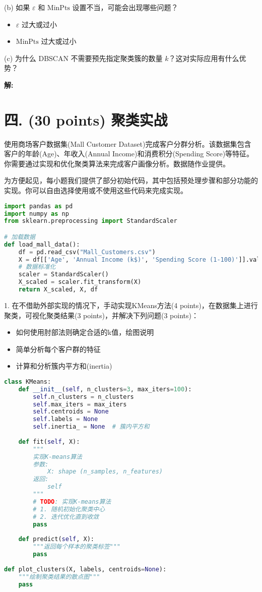 \documentclass[8pt]{article}
\begin{document}
(b) 如果 \( \varepsilon \) 和 \( \text{MinPts} \) 设置不当，可能会出现哪些问题？  
\begin{itemize}
    \item \( \varepsilon \) 过大或过小    
    \item \( \text{MinPts} \) 过大或过小  
\end{itemize}
   
(c) 为什么 DBSCAN 不需要预先指定聚类簇的数量 \( k \)？这对实际应用有什么优势？

\textbf{\large 解:}

\vspace{3em}

\section*{四. (30 points) 聚类实战}
使用商场客户数据集(Mall Customer Dataset)完成客户分群分析。该数据集包含客户的年龄(Age)、年收入(Annual Income)和消费积分(Spending Score)等特征。你需要通过实现和优化聚类算法来完成客户画像分析。数据随作业提供。

为方便起见，每小题我们提供了部分初始代码，其中包括预处理步骤和部分功能的实现。你可以自由选择使用或不使用这些代码来完成实现。
\begin{lstlisting}[language=Python, caption=数据加载]
import pandas as pd
import numpy as np
from sklearn.preprocessing import StandardScaler

# 加载数据
def load_mall_data():
    df = pd.read_csv("Mall_Customers.csv")
    X = df[['Age', 'Annual Income (k$)', 'Spending Score (1-100)']].values
    # 数据标准化
    scaler = StandardScaler()
    X_scaled = scaler.fit_transform(X)
    return X_scaled, X, df
\end{lstlisting}
1. 在不借助外部实现的情况下，手动实现KMeans方法(4 points)，在数据集上进行聚类，可视化聚类结果(3 points)，并解决下列问题(3 points)：
\begin{itemize}
    \item 如何使用肘部法则确定合适的k值，绘图说明
    \item 简单分析每个客户群的特征
    \item 计算和分析簇内平方和(inertia)
\end{itemize}

\begin{lstlisting}[language=Python, caption=Kmeans部分实现]
class KMeans:
    def __init__(self, n_clusters=3, max_iters=100):
        self.n_clusters = n_clusters
        self.max_iters = max_iters
        self.centroids = None
        self.labels = None
        self.inertia_ = None  # 簇内平方和
        
    def fit(self, X):
        """
        实现K-means算法
        参数:
            X: shape (n_samples, n_features)
        返回:
            self
        """
        # TODO: 实现K-means算法
        # 1. 随机初始化聚类中心
        # 2. 迭代优化直到收敛
        pass
    
    def predict(self, X):
        """返回每个样本的聚类标签"""
        pass
        
def plot_clusters(X, labels, centroids=None):
    """绘制聚类结果的散点图"""
    pass
\end{lstlisting}
\end{document}

